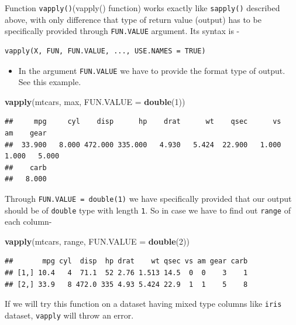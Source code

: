 \documentclass[
]{book}
\newenvironment{Shaded}{\begin{snugshade}}{\end{snugshade}}
\newcommand{\AttributeTok}[1]{\textcolor[rgb]{0.13,0.29,0.53}{#1}}
\newcommand{\DecValTok}[1]{\textcolor[rgb]{0.00,0.00,0.81}{#1}}
\newcommand{\FunctionTok}[1]{\textcolor[rgb]{0.13,0.29,0.53}{\textbf{#1}}}
\newcommand{\NormalTok}[1]{#1}
\providecommand{\tightlist}{%
  \setlength{\itemsep}{0pt}\setlength{\parskip}{0pt}}
\begin{document}
Function \texttt{vapply()}\index(vapply() function) works exactly like \texttt{sapply()} described above, with only difference that type of return value (output) has to be specifically provided through \texttt{FUN.VALUE} argument. Its syntax is -

\begin{verbatim}
vapply(X, FUN, FUN.VALUE, ..., USE.NAMES = TRUE)
\end{verbatim}

\begin{itemize}
\tightlist
\item
  In the argument \texttt{FUN.VALUE} we have to provide the format type of output. See this example.
\end{itemize}

\begin{Shaded}
\begin{Highlighting}[]
\FunctionTok{vapply}\NormalTok{(mtcars, max, }\AttributeTok{FUN.VALUE =} \FunctionTok{double}\NormalTok{(}\DecValTok{1}\NormalTok{))}
\end{Highlighting}
\end{Shaded}

\begin{verbatim}
##     mpg     cyl    disp      hp    drat      wt    qsec      vs      am    gear 
##  33.900   8.000 472.000 335.000   4.930   5.424  22.900   1.000   1.000   5.000 
##    carb 
##   8.000
\end{verbatim}

Through \texttt{FUN.VALUE\ =\ double(1)} we have specifically provided that our output should be of \texttt{double} type with length \texttt{1}. So in case we have to find out \texttt{range} of each column-

\begin{Shaded}
\begin{Highlighting}[]
\FunctionTok{vapply}\NormalTok{(mtcars, range, }\AttributeTok{FUN.VALUE =} \FunctionTok{double}\NormalTok{(}\DecValTok{2}\NormalTok{))}
\end{Highlighting}
\end{Shaded}

\begin{verbatim}
##       mpg cyl  disp  hp drat    wt qsec vs am gear carb
## [1,] 10.4   4  71.1  52 2.76 1.513 14.5  0  0    3    1
## [2,] 33.9   8 472.0 335 4.93 5.424 22.9  1  1    5    8
\end{verbatim}

If we will try this function on a dataset having mixed type columns like \texttt{iris} dataset, \texttt{vapply} will throw an error.
\end{document}
